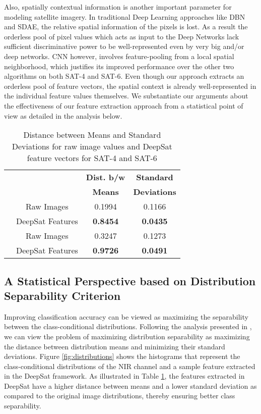 \documentclass[11pt,a4paper]{article}
\begin{document}
Also, spatially contextual information is another important parameter for modeling satellite imagery. In traditional Deep Learning approaches like DBN and SDAE, the relative spatial information of the pixels is lost. As a result the orderless pool of pixel values which acts as input to the Deep Networks lack sufficient discriminative power to be well-represented even by very big and/or deep networks. CNN however, involves feature-pooling from a local spatial neighborhood, which justifies its improved performance over the other two algorithms on both SAT-4 and SAT-6. Even though our approach extracts an orderless pool of feature vectors, the spatial context is already well-represented in the individual feature values themselves. We substantiate our arguments about the effectiveness of our feature extraction approach from a statistical point of view as detailed in the analysis below.  
\begin{table}[h]
\centering
\begin{tabular}{ | c | c | c | c | }
    \hline
 &   & \textbf{Dist. b/w} & \textbf{Standard} \\ 
 &   & \textbf{Means} &   \textbf{Deviations}  \\ \hline
 \multirow{2}{*}{\raisebox{-.15in}{\rotatebox{90}{\tiny{SAT-4}}}} & Raw Images & 0.1994 & 0.1166 \\ 
  & DeepSat Features & \textbf{0.8454} & \textbf{0.0435} \\ \hline
 \multirow{2}{*}{\raisebox{-.15in}{\rotatebox{90}{\tiny{SAT-6}}}} & Raw Images & 0.3247 & 0.1273 \\
  & DeepSat Features & \textbf{0.9726} & \textbf{0.0491} \\ \hline
  \end{tabular}
  \caption{Distance between Means and Standard Deviations for raw image values and DeepSat feature vectors for SAT-4 and SAT-6}
  \label{table:Distribution_mean_and_sd}
\end{table}

\subsection{A Statistical Perspective based on Distribution Separability Criterion}\label{statistical_perspective}
Improving classification accuracy can be viewed as maximizing the separability between the class-conditional distributions. Following the analysis presented in \cite{Boureau10atheoretical}, we can view the problem of maximizing distribution separability as maximizing the distance between distribution means and minimizing their standard deviations. Figure \ref{fig:distributions} shows the histograms that represent the class-conditional distributions of the NIR channel and a sample feature extracted in the DeepSat framework. As illustrated in Table \ref{table:Distribution_mean_and_sd}, the features extracted in DeepSat have a higher distance between means and a lower standard deviation as compared to the original image distributions, thereby ensuring better class separability.
\end{document}

